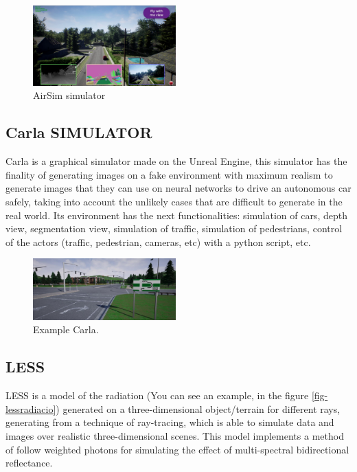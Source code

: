 \documentclass[10pt,a4paper,twocolumn,twoside]{article}
\begin{document}
\begin{figure}[!h]
\centering
  	\includegraphics[width=0.49\textwidth]{airsim}
	\caption{AirSim simulator}
	\label{fig-airsim}
\end{figure}

\subsection{Carla SIMULATOR}

Carla is a graphical simulator made on the Unreal Engine, this simulator has the finality of generating images on a fake environment with maximum realism to generate images that they can use on neural networks to drive an autonomous car safely, taking into account the unlikely cases that are difficult to generate in the real world. Its environment has the next functionalities: simulation of cars, depth view, segmentation view, simulation of traffic,  simulation of pedestrians, control of the actors (traffic, pedestrian, cameras, etc) with a python script, etc.

\begin{figure}[!h]
\centering
  	\includegraphics[width=0.49\textwidth]{carlatown}
	\caption{Example Carla.}
	\label{fig-airsim}
\end{figure}

\subsection{LESS}
LESS is a model of the radiation (You can see an example, in the figure \ref{fig-lessradiacio}) generated on a three-dimensional object/terrain for different rays, generating from a technique of ray-tracing, which is able to simulate data and images over realistic three-dimensional scenes. This model implements a method of follow weighted photons for simulating the effect of multi-spectral bidirectional reflectance.
\end{document}
